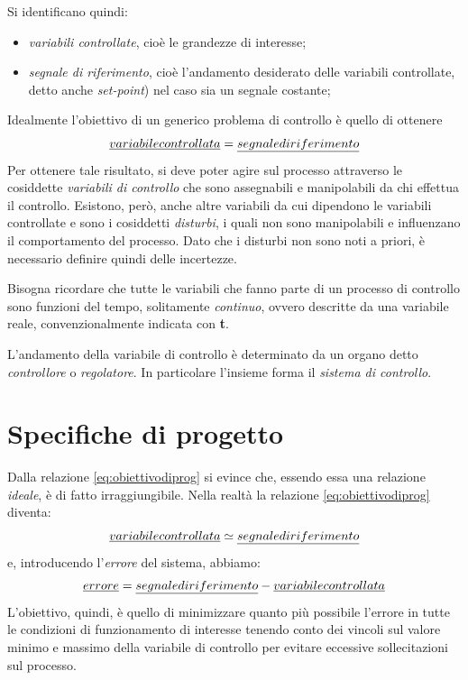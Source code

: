 \documentclass[a4paper]{report}
\begin{document}
Si identificano quindi: 
\begin{itemize}
\item \emph{variabili controllate}, cio\`e le grandezze di interesse;
\item \emph{segnale di riferimento}, cio\`e l'andamento desiderato
  delle variabili controllate, detto anche \emph{set-point}) nel
  caso sia un segnale costante;
\end{itemize}
Idealmente l'obiettivo di un generico problema di controllo \`e quello
di ottenere 
\begin{equation} 
  \label{eq:obiettivodiprog}
  \emph{variabile controllata} = \emph{segnale di riferimento} 
\end{equation}
Per ottenere tale risultato, si deve poter agire sul processo
attraverso le cosiddette \emph{variabili di controllo} che sono
assegnabili e manipolabili da chi effettua il controllo.
Esistono, per\`o, anche altre variabili da cui dipendono le variabili
controllate e sono i cosiddetti \emph{disturbi}, i quali non sono
manipolabili e influenzano il comportamento del processo. Dato che i
disturbi non sono noti a priori, \`e necessario definire quindi delle
incertezze. 

Bisogna ricordare che tutte le variabili che fanno parte di un
processo di controllo sono funzioni del tempo, solitamente
\emph{continuo}, ovvero descritte da una variabile reale,
convenzionalmente indicata con \textbf{t}. 

L'andamento della variabile di controllo \`e determinato da un organo
detto \emph{controllore} o \emph{regolatore}. In particolare l'insieme 
 forma il \emph{sistema di controllo}.

\section{Specifiche di progetto}
Dalla relazione \ref{eq:obiettivodiprog} si evince che, essendo essa
una relazione \textit{ideale}, \`e di fatto irraggiungibile. Nella
realt\`a la relazione \ref{eq:obiettivodiprog} diventa: 
\begin{equation}\label{eq:obiettivoreale}
  \emph{variabile controllata}  \simeq \emph{segnale di riferimento}
\end{equation} 
e, introducendo l'\emph{errore} del sistema, abbiamo:
\begin{equation}\label{eq:deferrore}
  \emph{errore}  = \emph{segnale di riferimento} - \emph{variabile controllata}
\end{equation}
L'obiettivo, quindi, \`e quello di minimizzare quanto pi\`u possibile
l'errore in tutte le condizioni di funzionamento di interesse tenendo
conto dei vincoli sul valore minimo e massimo della variabile di
controllo per evitare eccessive sollecitazioni sul processo. 
\end{document}

